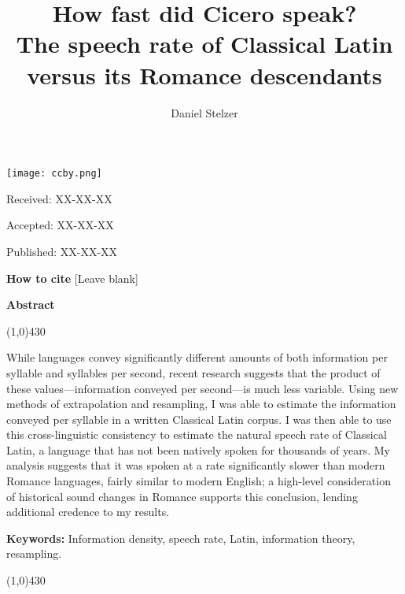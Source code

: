\documentclass[12pt,twoside]{article}
\title{{\Huge{}How fast did Cicero speak?}\\{\Large{}The speech rate of Classical Latin versus its Romance descendants}}
\author{Daniel Stelzer}
\affil{University of Illinois at Urbana-Champaign\\stelzer3@illinois.edu}
\date{}
\makeatletter
\def\maketitle{{%
		\renewenvironment{tabular}[2][]
		{\begin{flushleft}}
			{\end{flushleft}}
		\AB@maketitle}}
\makeatother
\begin{document}
\maketitle

\thispagestyle{first}

\vspace{0.5cm}
\noindent \texttt{[image: ccby.png]}

\hfill Received: XX-XX-XX

\hfill Accepted: XX-XX-XX

\hfill Published: XX-XX-XX

\vspace{1cm}

\noindent \textbf{How to cite} [Leave blank]

\vspace{1.5cm}

\noindent \textbf{Abstract}
\begin{center}
 	\line(1,0){430}
\end{center}
\vspace{-0,3cm}
\noindent While languages convey significantly different amounts of both information per syllable and syllables per second, recent research suggests that the product of these values---information conveyed per second---is much less variable. Using new methods of extrapolation and resampling, I was able to estimate the information conveyed per syllable in a written Classical Latin corpus. I was then able to use this cross-linguistic consistency to estimate the natural speech rate of Classical Latin, a language that has not been natively spoken for thousands of years. My analysis suggests that it was spoken at a rate significantly slower than modern Romance languages, fairly similar to modern English; a high-level consideration of historical sound changes in Romance supports this conclusion, lending additional credence to my results.

\vspace{5mm}

\noindent \textbf{Keywords:} Information density, speech rate, Latin, information theory, resampling.

\vspace{4mm}
\begin{center}
	\line(1,0){430}
\end{center}

\end{document}
